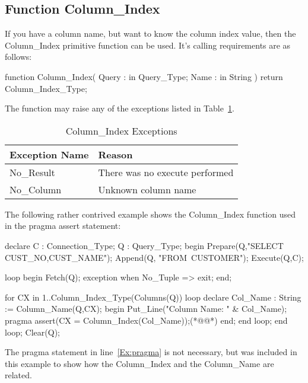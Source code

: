 \documentclass[english,letterpaper]{book}
\begin{document}
\subsection{Function Column\_Index}

If you have a column name, but want to know the column index value,
then the Column\_Index primitive function can be used. It's calling
requirements are as follows:

\begin{Code}
function Column_Index(
   Query : in Query_Type;
   Name :  in String
) return Column_Index_Type;
\end{Code}

The function may raise any of the exceptions listed in Table~\ref{t:cidxx}.

\begin{table}
   \begin{center}
      \begin{tabular}{ll}
         Exception Name    &  Reason\\
         \hline 
         No\_Result        &  There was no execute performed\\
         No\_Column        &  Unknown column name\\
      \end{tabular}
   \end{center}
   \caption{Column\_Index Exceptions}\label{t:cidxx}
\end{table}

The following rather contrived example shows the Column\_Index function
used in the pragma assert statement:

\begin{NumberedExample}
declare
   C : Connection_Type;
   Q : Query_Type;
begin
   Prepare(Q,"SELECT CUST_NO,CUST_NAME");
   Append(Q, "FROM~CUSTOMER");
   Execute(Q,C);

   loop
      begin
         Fetch(Q);
      exception
         when No_Tuple =>
            exit;
      end;

      for CX in 1..Column_Index_Type(Columns(Q)) loop
         declare
            Col_Name : String := Column_Name(Q,CX);
         begin
            Put_Line("Column Name: " & Col_Name);
            pragma assert(CX = Column_Index(Col_Name));(*@\label{Ex:pragma}@*)
         end;
      end loop;
   end loop;
   Clear(Q);
\end{NumberedExample}

The pragma statement in line~\ref{Ex:pragma} is not necessary, but 
was included in this example to show how the Column\_Index and the
Column\_Name are related.
\end{document}
